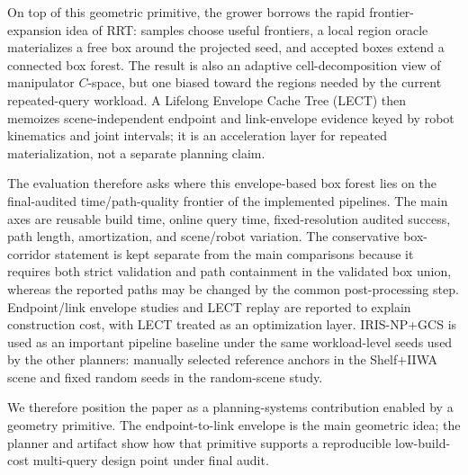 \documentclass[journal]{IEEEtran}
\begin{document}
On top of this geometric primitive, the grower borrows the rapid
frontier-expansion idea of RRT: samples choose useful frontiers, a local region
oracle materializes a free box around the projected seed, and accepted boxes
extend a connected box forest. The result is also an adaptive cell-decomposition
view of manipulator $C$-space, but one biased toward the regions needed by the
current repeated-query workload. A Lifelong Envelope Cache Tree (LECT) then memoizes scene-independent endpoint
and link-envelope evidence keyed by robot kinematics and joint intervals; it is
an acceleration layer for repeated materialization, not a separate planning
claim.

The evaluation therefore asks where this envelope-based box forest lies on the
final-audited time/path-quality frontier of the implemented pipelines. The main
axes are reusable build time, online query time, fixed-resolution audited
success, path length, amortization, and scene/robot variation. The conservative
box-corridor statement is kept separate from the main comparisons because it
requires both strict validation and path containment in the validated box union,
whereas the reported paths may be changed by the common post-processing step.
Endpoint/link
envelope studies and LECT replay are reported to explain construction cost, with
LECT treated as an optimization layer. IRIS-NP+GCS is used as an important
pipeline baseline under the same workload-level seeds used by the other
planners: manually selected reference anchors in the Shelf+IIWA scene and fixed
random seeds in the random-scene study.

We therefore position the paper as a planning-systems contribution enabled by a
geometry primitive. The endpoint-to-link envelope is the main geometric idea;
the planner and artifact show how that primitive supports a reproducible
low-build-cost multi-query design point under final audit.
\end{document}
